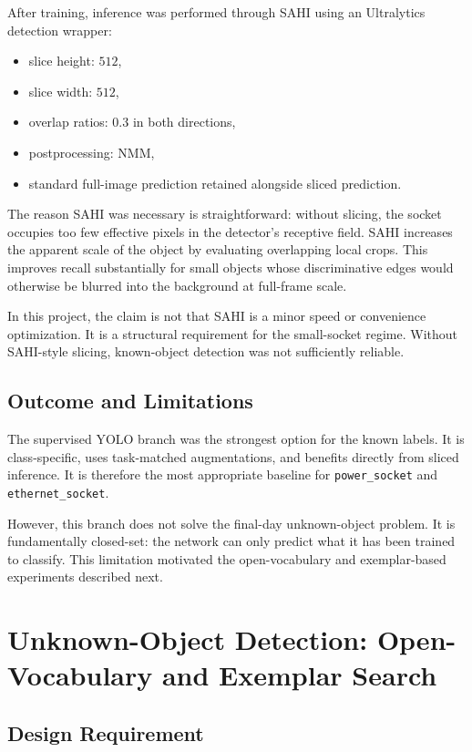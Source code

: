 \documentclass[11pt,a4paper]{article}
\begin{document}
After training, inference was performed through SAHI using an Ultralytics detection wrapper:
\begin{itemize}[leftmargin=1.5em]
  \item slice height: \(512\),
  \item slice width: \(512\),
  \item overlap ratios: \(0.3\) in both directions,
  \item postprocessing: NMM,
  \item standard full-image prediction retained alongside sliced prediction.
\end{itemize}

The reason SAHI was necessary is straightforward: without slicing, the socket occupies too few effective pixels in the detector's receptive field. SAHI increases the apparent scale of the object by evaluating overlapping local crops. This improves recall substantially for small objects whose discriminative edges would otherwise be blurred into the background at full-frame scale.

In this project, the claim is not that SAHI is a minor speed or convenience optimization. It is a structural requirement for the small-socket regime. Without SAHI-style slicing, known-object detection was not sufficiently reliable.

\subsection{Outcome and Limitations}

The supervised YOLO branch was the strongest option for the known labels. It is class-specific, uses task-matched augmentations, and benefits directly from sliced inference. It is therefore the most appropriate baseline for \texttt{power\_socket} and \texttt{ethernet\_socket}.

However, this branch does not solve the final-day unknown-object problem. It is fundamentally closed-set: the network can only predict what it has been trained to classify. This limitation motivated the open-vocabulary and exemplar-based experiments described next.

\section{Unknown-Object Detection: Open-Vocabulary and Exemplar Search}

\subsection{Design Requirement}
\end{document}
